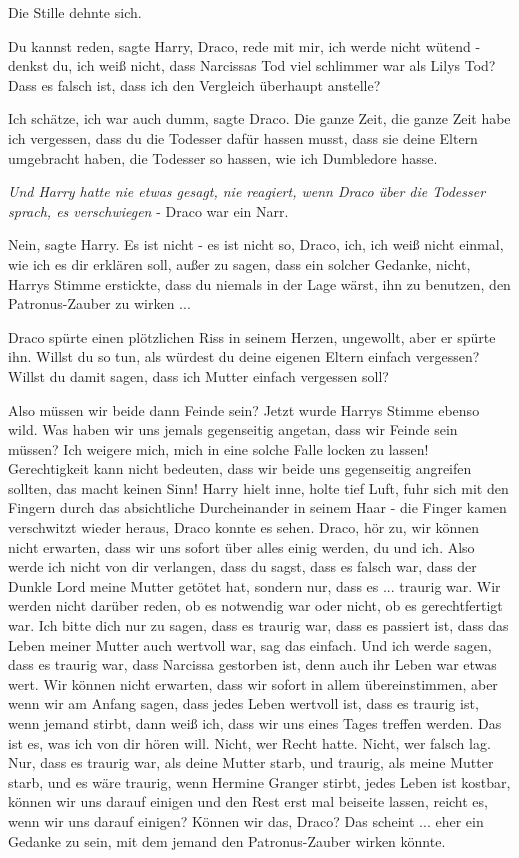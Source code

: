 Die Stille dehnte sich.

\glqq{}Du kannst reden\grqq{}, sagte Harry, \glqq{}Draco, rede mit mir, ich werde
nicht wütend - denkst du, ich weiß nicht, dass Narcissas Tod viel schlimmer war
als Lilys Tod? Dass es falsch ist, dass ich den Vergleich überhaupt
anstelle?\grqq{}

\glqq{}Ich schätze, ich war auch dumm\grqq{}, sagte Draco. \glqq{}Die ganze Zeit,
die ganze Zeit habe ich vergessen, dass du die Todesser dafür hassen musst, dass
sie deine Eltern umgebracht haben, die Todesser so hassen, wie ich Dumbledore
hasse.\grqq{}

\emph{Und Harry hatte nie etwas gesagt, nie reagiert, wenn Draco über die
Todesser sprach, es verschwiegen} - Draco war ein Narr.

\glqq{}Nein\grqq{}, sagte Harry. \glqq{}Es ist nicht - es ist nicht so, Draco,
ich, ich weiß nicht einmal, wie ich es dir erklären soll, außer zu sagen, dass
ein solcher Gedanke, nicht\grqq{}, Harrys Stimme erstickte, \glqq{}dass du
niemals in der Lage wärst, ihn zu benutzen, den Patronus-Zauber zu
wirken ...\grqq{}

Draco spürte einen plötzlichen Riss in seinem Herzen, ungewollt, aber er spürte
ihn. \glqq{}Willst du so tun, als würdest du deine eigenen Eltern einfach
vergessen? Willst du damit sagen, dass ich Mutter einfach vergessen soll?\grqq{}

\glqq{}Also müssen wir beide dann Feinde sein?\grqq{} Jetzt wurde Harrys Stimme
ebenso wild. \glqq{}Was haben wir uns jemals gegenseitig angetan, dass wir Feinde
sein müssen? Ich weigere mich, mich in eine solche Falle locken zu lassen!
Gerechtigkeit kann nicht bedeuten, dass wir beide uns gegenseitig angreifen
sollten, das macht keinen Sinn!\grqq{} Harry hielt inne, holte tief Luft, fuhr
sich mit den Fingern durch das absichtliche Durcheinander in seinem Haar - die
Finger kamen verschwitzt wieder heraus, Draco konnte es sehen. \glqq{}Draco, hör
zu, wir können nicht erwarten, dass wir uns sofort über alles einig werden, du
und ich. Also werde ich nicht von dir verlangen, dass du sagst, dass es falsch
war, dass der Dunkle Lord meine Mutter getötet hat, sondern nur, dass es ...
traurig war. Wir werden nicht darüber reden, ob es notwendig war oder nicht, ob
es gerechtfertigt war. Ich bitte dich nur zu sagen, dass es traurig war, dass es
passiert ist, dass das Leben meiner Mutter auch wertvoll war, sag das einfach.
Und ich werde sagen, dass es traurig war, dass Narcissa gestorben ist, denn auch
ihr Leben war etwas wert. Wir können nicht erwarten, dass wir sofort in allem
übereinstimmen, aber wenn wir am Anfang sagen, dass jedes Leben wertvoll ist,
dass es traurig ist, wenn jemand stirbt, dann weiß ich, dass wir uns eines Tages
treffen werden. Das ist es, was ich von dir hören will. Nicht, wer Recht hatte.
Nicht, wer falsch lag. Nur, dass es traurig war, als deine Mutter starb, und
traurig, als meine Mutter starb, und es wäre traurig, wenn Hermine Granger
stirbt, jedes Leben ist kostbar, können wir uns darauf einigen und den Rest erst
mal beiseite lassen, reicht es, wenn wir uns darauf einigen? Können wir das,
Draco? Das scheint ... eher ein Gedanke zu sein, mit dem jemand den
Patronus-Zauber wirken könnte.\grqq{}

